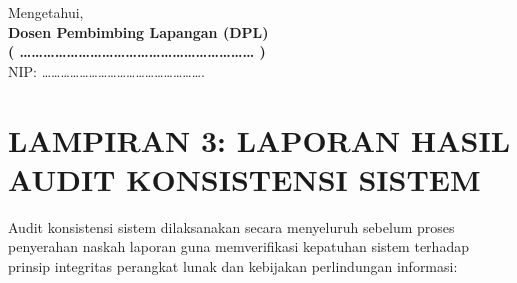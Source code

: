 \documentclass[
  indonesian,
  12pt,
]{report}
\begin{document}
\vspace{1cm}

Mengetahui,\\
\textbf{Dosen Pembimbing Lapangan (DPL)}\\
\vspace{2.2cm} \textbf{(
\ldots\ldots\ldots\ldots\ldots\ldots\ldots\ldots\ldots\ldots\ldots\ldots\ldots\ldots\ldots\ldots\ldots\ldots\ldots\ldots{}
)}\\
NIP:
\ldots\ldots\ldots\ldots\ldots\ldots\ldots\ldots\ldots\ldots\ldots\ldots\ldots\ldots\ldots\ldots\ldots.

\newpage

\chapter*{LAMPIRAN 3: LAPORAN HASIL AUDIT KONSISTENSI
SISTEM}\label{lampiran-3-laporan-hasil-audit-konsistensi-sistem}

Audit konsistensi sistem dilaksanakan secara menyeluruh sebelum proses
penyerahan naskah laporan guna memverifikasi kepatuhan sistem terhadap
prinsip integritas perangkat lunak dan kebijakan perlindungan informasi:
\end{document}
